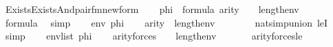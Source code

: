 \begin{isabellebody}
\ {\isacharquery}{\kern0pt}{\isasympsi}{\isacharequal}{\kern0pt}{\isachardoublequoteopen}Exists{\isacharparenleft}{\kern0pt}Exists{\isacharparenleft}{\kern0pt}And{\isacharparenleft}{\kern0pt}pair{\isacharunderscore}{\kern0pt}fm{\isacharparenleft}{\kern0pt}{}{\isacharcomma}{\kern0pt}{}{\isacharcomma}{\kern0pt}{}{\isacharparenright}{\kern0pt}{\isacharcomma}{\kern0pt}{\isacharquery}{\kern0pt}new{\isacharunderscore}{\kern0pt}form{\isacharparenright}{\kern0pt}{\isacharparenright}{\kern0pt}{\isacharparenright}{\kern0pt}{\isachardoublequoteclose}\isanewline
\ \ \isamarkupfalse%
\ phi\ {\isacharequal}{\kern0pt}\ {\isacartoucheopen}{\isasymphi}{\isasymin}formula{\isacartoucheclose}\ {\isacartoucheopen}arity{\isacharparenleft}{\kern0pt}{\isasymphi}{\isacharparenright}{\kern0pt}\ {\isasymle}\ {}\ {\isacharhash}{\kern0pt}{\isacharplus}{\kern0pt}\ length{\isacharparenleft}{\kern0pt}env{\isacharparenright}{\kern0pt}{\isacartoucheclose}\ \isanewline
\ \ \isamarkupfalse%
\isanewline
\ \ \isamarkupfalse%
\ {\isachardoublequoteopen}{\isacharquery}{\kern0pt}{\isasymchi}{\isasymin}formula{\isachardoublequoteclose}\ \isamarkupfalse%
\ simp\isanewline
\ \ \isamarkupfalse%
\ {\isacartoucheopen}env{\isasymin}{\isacharunderscore}{\kern0pt}{\isacartoucheclose}\ phi\isanewline
\ \ \isamarkupfalse%
\ {\isachardoublequoteopen}arity{\isacharparenleft}{\kern0pt}{\isacharquery}{\kern0pt}{\isasymchi}{\isacharparenright}{\kern0pt}\ {\isasymle}\ {}{\isacharhash}{\kern0pt}{\isacharplus}{\kern0pt}length{\isacharparenleft}{\kern0pt}env{\isacharparenright}{\kern0pt}\ {\isachardoublequoteclose}\ \isanewline
\ \ \ \ \isamarkupfalse%
\ nat{\isacharunderscore}{\kern0pt}simp{\isacharunderscore}{\kern0pt}union\ leI\ \isamarkupfalse%
\ simp\isanewline
\ \ \isamarkupfalse%
\ {\isacartoucheopen}env{\isasymin}list{\isacharparenleft}{\kern0pt}{\isacharunderscore}{\kern0pt}{\isacharparenright}{\kern0pt}{\isacartoucheclose}\ phi\isanewline
\ \ \isamarkupfalse%
\ {\isachardoublequoteopen}arity{\isacharparenleft}{\kern0pt}forces{\isacharparenleft}{\kern0pt}{\isacharquery}{\kern0pt}{\isasymchi}{\isacharparenright}{\kern0pt}{\isacharparenright}{\kern0pt}\ {\isasymle}\ {}\ {\isacharhash}{\kern0pt}{\isacharplus}{\kern0pt}\ length{\isacharparenleft}{\kern0pt}env{\isacharparenright}{\kern0pt}{\isachardoublequoteclose}\isanewline
\ \ \ \ \isamarkupfalse%
\ \ arity{\isacharunderscore}{\kern0pt}forces{\isacharunderscore}{\kern0pt}le\ \isamarkupfalse%

\end{isabellebody}
